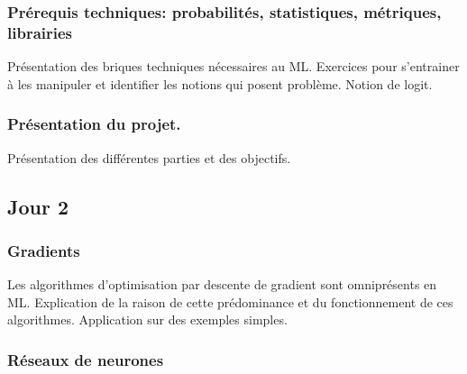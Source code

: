 \documentclass[
10pt, %
a4paper, %
oneside, %
headinclude,footinclude, %
BCOR5mm, %
]{scrartcl}
\begin{document}
\subsubsection{Prérequis techniques: probabilités, statistiques, métriques, librairies}%
\label{ssub:}

Présentation des briques techniques nécessaires au ML. Exercices pour s'entrainer à les manipuler et identifier les notions qui posent problème. Notion de logit.

\subsubsection{Présentation du projet.}%
\label{ssub:}

Présentation des différentes parties et des objectifs.


\subsection{\large{Jour 2}}%
\label{sec:Jour 2}

%
\subsubsection{Gradients}%
\label{ssub:}

Les algorithmes d'optimisation par descente de gradient sont omniprésents en ML. Explication de la raison de cette prédominance et du fonctionnement de ces algorithmes. Application sur des exemples simples.

\subsubsection{Réseaux de neurones}%
\label{ssub:}
\end{document}

